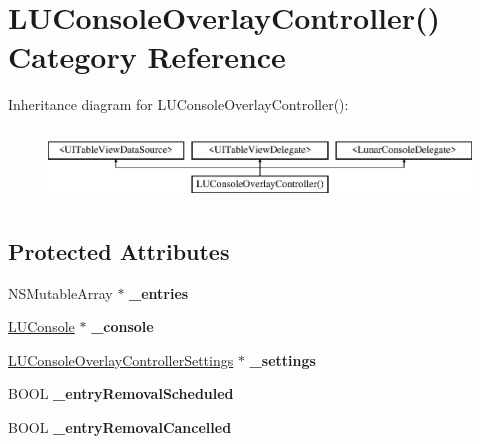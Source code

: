 \hypertarget{category_l_u_console_overlay_controller_07_08}{}\section{L\+U\+Console\+Overlay\+Controller() Category Reference}
\label{category_l_u_console_overlay_controller_07_08}
Inheritance diagram for L\+U\+Console\+Overlay\+Controller()\+:\begin{figure}[H]
\begin{center}
\leavevmode
\includegraphics[height=1.954625cm]{category_l_u_console_overlay_controller_07_08}
\end{center}
\end{figure}
\subsection*{Protected Attributes}
\begin{DoxyCompactItemize}
\item 
\mbox{\label{category_l_u_console_overlay_controller_07_08_aca8a85b03919113479e0e7eab571602a}} 
N\+S\+Mutable\+Array $\ast$ {\bfseries \+\_\+entries}
\item 
\mbox{\label{category_l_u_console_overlay_controller_07_08_adbe6c39bd54115ac185679d8b7ab50a8}} 
\mbox{\hyperlink{interface_l_u_console}{L\+U\+Console}} $\ast$ {\bfseries \+\_\+console}
\item 
\mbox{\label{category_l_u_console_overlay_controller_07_08_a3b00d01bc265dcc2ca0d1997abc1835d}} 
\mbox{\hyperlink{interface_l_u_console_overlay_controller_settings}{L\+U\+Console\+Overlay\+Controller\+Settings}} $\ast$ {\bfseries \+\_\+settings}
\item 
\mbox{\label{category_l_u_console_overlay_controller_07_08_afedf7cee5b209b1984ac9705cf1bd03f}} 
B\+O\+OL {\bfseries \+\_\+entry\+Removal\+Scheduled}
\item 
\mbox{\label{category_l_u_console_overlay_controller_07_08_adc3d31dd6eb7f0053fd691cf269bee82}} 
B\+O\+OL {\bfseries \+\_\+entry\+Removal\+Cancelled}
\end{DoxyCompactItemize}
